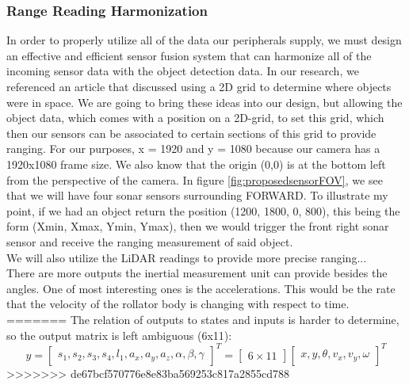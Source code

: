 \subsubsection{Range Reading Harmonization}
\noindent In order to properly utilize all of the data our peripherals supply, we must design an effective and efficient sensor fusion system that can harmonize all of the incoming sensor data with the object detection data. In our research, we referenced an article \cite{CVRef2} that discussed using a 2D grid to determine where objects were in space. We are going to bring these ideas into our design, but allowing the object data, which comes with a position on a 2D-grid, to set this grid, which then our sensors can be associated to certain sections of this grid to provide ranging. For our purposes, x = 1920 and y = 1080 because our camera has a 1920x1080 frame size. We also know that the origin (0,0) is at the bottom left from the perspective of the camera. In figure \ref{fig:proposedsensorFOV}, we see that we will have four sonar sensors surrounding FORWARD. To illustrate my point, if we had an object return the position (1200, 1800, 0, 800), this being the form (Xmin, Xmax, Ymin, Ymax), then we would trigger the front right sonar sensor and receive the ranging measurement of said object. \\

\noindent We will also utilize the LiDAR readings to provide more precise ranging... \\

\noindent There are more outputs the inertial measurement unit can provide besides the angles. One of most interesting ones is the accelerations. This would be the rate that the velocity of the rollator body is changing with respect to time. 
=======
\noindent The relation of outputs to states and inputs is harder to determine, so the output matrix is left ambiguous (6x11):
\[y =
\begin{bmatrix}
	s_1, s_2, s_3, s_4, l_1, a_x, a_y, a_z, \alpha, \beta, \gamma
\end{bmatrix}^T = 
\begin{bmatrix}
	6\times 11
\end{bmatrix}
\begin{bmatrix}
	x, y, \theta, v_x, v_y, \omega
\end{bmatrix}^T
\]
>>>>>>> de67bcf570776e8e83ba569253c817a2855cd788


